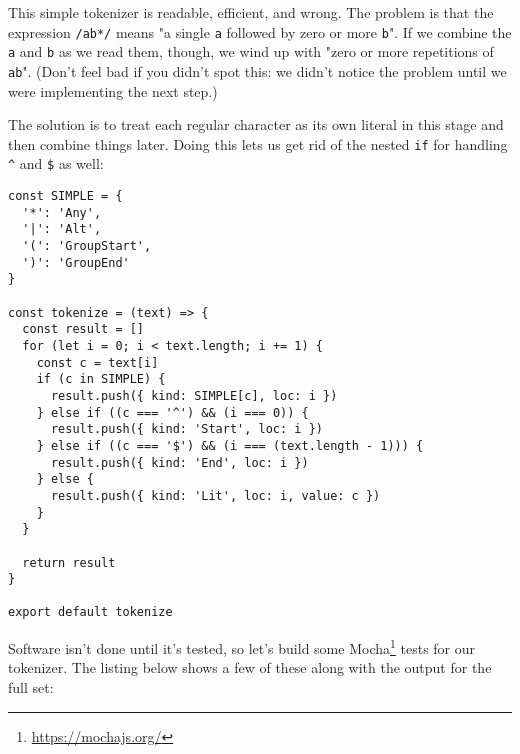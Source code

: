\documentclass[krantzl]{krantz}
\newcommand{\hreffoot}[2]{{#1}\footnote{\href{#2}{#2}}}
\begin{document}
This simple tokenizer is readable, efficient, and wrong.
The problem is that the expression \texttt{/ab*/} means "a single \texttt{a} followed by zero or more \texttt{b}".
If we combine the \texttt{a} and \texttt{b} as we read them,
though,
we wind up with "zero or more repetitions of \texttt{ab}".
(Don't feel bad if you didn't spot this:
we didn't notice the problem until we were implementing the next step.)


The solution is to treat each regular character as its own literal in this stage
and then combine things later.
Doing this lets us get rid of the nested \texttt{if} for handling \texttt{{\textasciicircum}} and \texttt{\$} as well:


\begin{lstlisting}[frame=single,frameround=tttt]
const SIMPLE = {
  '*': 'Any',
  '|': 'Alt',
  '(': 'GroupStart',
  ')': 'GroupEnd'
}

const tokenize = (text) => {
  const result = []
  for (let i = 0; i < text.length; i += 1) {
    const c = text[i]
    if (c in SIMPLE) {
      result.push({ kind: SIMPLE[c], loc: i })
    } else if ((c === '^') && (i === 0)) {
      result.push({ kind: 'Start', loc: i })
    } else if ((c === '$') && (i === (text.length - 1))) {
      result.push({ kind: 'End', loc: i })
    } else {
      result.push({ kind: 'Lit', loc: i, value: c })
    }
  }

  return result
}

export default tokenize
\end{lstlisting}



Software isn't done until it's tested,
so let's build some \hreffoot{Mocha}{https://mochajs.org/} tests for our tokenizer.
The listing below shows a few of these
along with the output for the full set:
\end{document}
